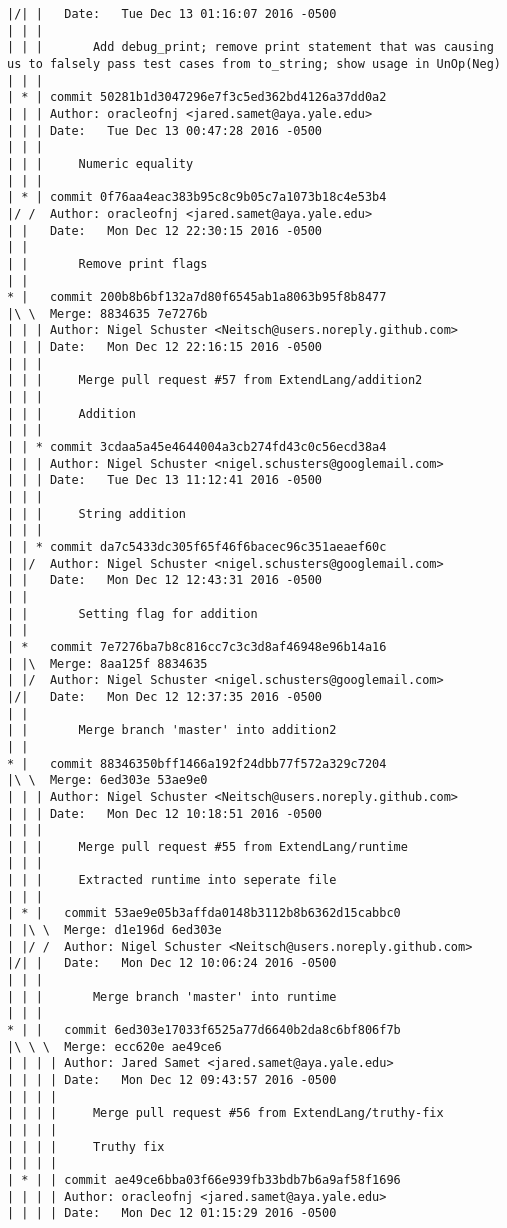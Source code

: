 \begin{lstlisting}
|/| |   Date:   Tue Dec 13 01:16:07 2016 -0500
| | |   
| | |       Add debug_print; remove print statement that was causing us to falsely pass test cases from to_string; show usage in UnOp(Neg)
| | |    
| * | commit 50281b1d3047296e7f3c5ed362bd4126a37dd0a2
| | | Author: oracleofnj <jared.samet@aya.yale.edu>
| | | Date:   Tue Dec 13 00:47:28 2016 -0500
| | | 
| | |     Numeric equality
| | |    
| * | commit 0f76aa4eac383b95c8c9b05c7a1073b18c4e53b4
|/ /  Author: oracleofnj <jared.samet@aya.yale.edu>
| |   Date:   Mon Dec 12 22:30:15 2016 -0500
| |   
| |       Remove print flags
| |     
* |   commit 200b8b6bf132a7d80f6545ab1a8063b95f8b8477
|\ \  Merge: 8834635 7e7276b
| | | Author: Nigel Schuster <Neitsch@users.noreply.github.com>
| | | Date:   Mon Dec 12 22:16:15 2016 -0500
| | | 
| | |     Merge pull request #57 from ExtendLang/addition2
| | |     
| | |     Addition
| | |    
| | * commit 3cdaa5a45e4644004a3cb274fd43c0c56ecd38a4
| | | Author: Nigel Schuster <nigel.schusters@googlemail.com>
| | | Date:   Tue Dec 13 11:12:41 2016 -0500
| | | 
| | |     String addition
| | |    
| | * commit da7c5433dc305f65f46f6bacec96c351aeaef60c
| |/  Author: Nigel Schuster <nigel.schusters@googlemail.com>
| |   Date:   Mon Dec 12 12:43:31 2016 -0500
| |   
| |       Setting flag for addition
| |     
| *   commit 7e7276ba7b8c816cc7c3c3d8af46948e96b14a16
| |\  Merge: 8aa125f 8834635
| |/  Author: Nigel Schuster <nigel.schusters@googlemail.com>
|/|   Date:   Mon Dec 12 12:37:35 2016 -0500
| |   
| |       Merge branch 'master' into addition2
| |     
* |   commit 88346350bff1466a192f24dbb77f572a329c7204
|\ \  Merge: 6ed303e 53ae9e0
| | | Author: Nigel Schuster <Neitsch@users.noreply.github.com>
| | | Date:   Mon Dec 12 10:18:51 2016 -0500
| | | 
| | |     Merge pull request #55 from ExtendLang/runtime
| | |     
| | |     Extracted runtime into seperate file
| | |      
| * |   commit 53ae9e05b3affda0148b3112b8b6362d15cabbc0
| |\ \  Merge: d1e196d 6ed303e
| |/ /  Author: Nigel Schuster <Neitsch@users.noreply.github.com>
|/| |   Date:   Mon Dec 12 10:06:24 2016 -0500
| | |   
| | |       Merge branch 'master' into runtime
| | |      
* | |   commit 6ed303e17033f6525a77d6640b2da8c6bf806f7b
|\ \ \  Merge: ecc620e ae49ce6
| | | | Author: Jared Samet <jared.samet@aya.yale.edu>
| | | | Date:   Mon Dec 12 09:43:57 2016 -0500
| | | | 
| | | |     Merge pull request #56 from ExtendLang/truthy-fix
| | | |     
| | | |     Truthy fix
| | | |     
| * | | commit ae49ce6bba03f66e939fb33bdb7b6a9af58f1696
| | | | Author: oracleofnj <jared.samet@aya.yale.edu>
| | | | Date:   Mon Dec 12 01:15:29 2016 -0500

\end{lstlisting}

